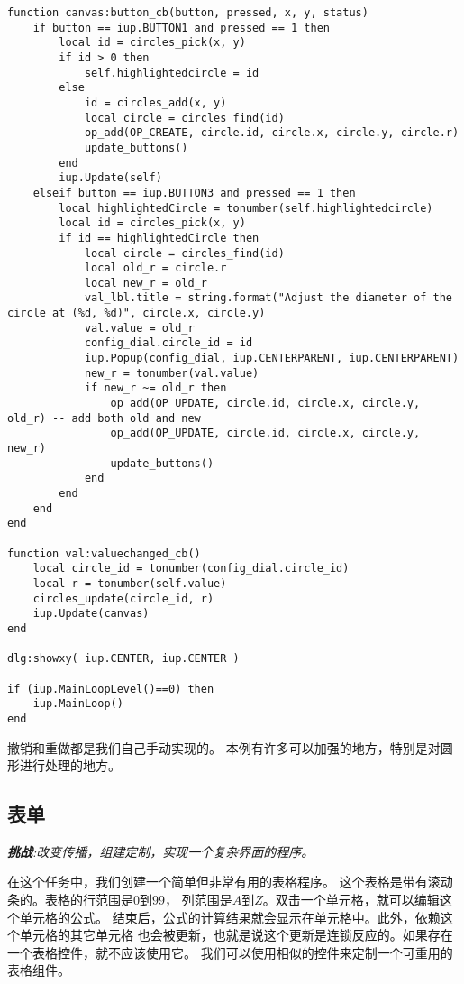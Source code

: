\documentclass{ctexart}
\begin{document}
\begin{lstlisting}
function canvas:button_cb(button, pressed, x, y, status)
	if button == iup.BUTTON1 and pressed == 1 then
		local id = circles_pick(x, y)
		if id > 0 then
			self.highlightedcircle = id
		else
			id = circles_add(x, y)
			local circle = circles_find(id)
			op_add(OP_CREATE, circle.id, circle.x, circle.y, circle.r)
			update_buttons()
		end
		iup.Update(self)
	elseif button == iup.BUTTON3 and pressed == 1 then
		local highlightedCircle = tonumber(self.highlightedcircle)
		local id = circles_pick(x, y)
		if id == highlightedCircle then
			local circle = circles_find(id)
			local old_r = circle.r
			local new_r = old_r
			val_lbl.title = string.format("Adjust the diameter of the circle at (%d, %d)", circle.x, circle.y)
			val.value = old_r
			config_dial.circle_id = id
			iup.Popup(config_dial, iup.CENTERPARENT, iup.CENTERPARENT)
			new_r = tonumber(val.value)
			if new_r ~= old_r then
				op_add(OP_UPDATE, circle.id, circle.x, circle.y, old_r) -- add both old and new
				op_add(OP_UPDATE, circle.id, circle.x, circle.y, new_r)
				update_buttons()
			end
		end
	end
end

function val:valuechanged_cb()
	local circle_id = tonumber(config_dial.circle_id)
	local r = tonumber(self.value)
	circles_update(circle_id, r)
	iup.Update(canvas)
end

dlg:showxy( iup.CENTER, iup.CENTER )

if (iup.MainLoopLevel()==0) then
	iup.MainLoop()
end
\end{lstlisting}

撤销和重做都是我们自己手动实现的。
本例有许多可以加强的地方，特别是对圆形进行处理的地方。

\subsection{表单}

\emph{\textbf{挑战}:改变传播，组建定制，实现一个复杂界面的程序。}

在这个任务中，我们创建一个简单但非常有用的表格程序。
这个表格是带有滚动条的。表格的行范围是$0$到$99$，
列范围是$A$到$Z$。双击一个单元格，就可以编辑这个单元格的公式。
结束后，公式的计算结果就会显示在单元格中。此外，依赖这个单元格的其它单元格
也会被更新，也就是说这个更新是连锁反应的。如果存在一个表格控件，就不应该使用它。
我们可以使用相似的控件来定制一个可重用的表格组件。
\end{document}
